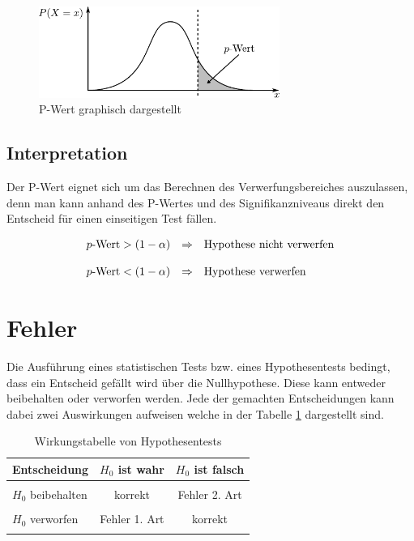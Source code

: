 \begin{figure}[h!]
	\centering
	\includegraphics[width=0.7\textwidth]{p-value.pdf}
	\caption{P-Wert graphisch dargestellt}
	\label{fig:p-wert}
\end{figure}

\subsection{Interpretation}
Der P-Wert eignet sich um das Berechnen des Verwerfungsbereiches auszulassen,
denn man kann anhand des P-Wertes und des Signifikanzniveaus direkt den 
Entscheid für einen einseitigen Test fällen.

\[ 
	\begin{array}{c c l}
		p\text{-Wert} > (1-\alpha)
			& \Rightarrow
			& \text{Hypothese nicht verwerfen} \\
		& & \\
		p\text{-Wert} < (1-\alpha)
			& \Rightarrow
			& \text{Hypothese verwerfen}
	\end{array} 
\]

\section{Fehler}
Die Ausführung eines statistischen Tests bzw. eines Hypothesentests bedingt,
dass ein Entscheid gefällt wird über die Nullhypothese. Diese kann entweder
beibehalten oder verworfen werden. Jede der gemachten Entscheidungen kann dabei
zwei Auswirkungen aufweisen welche in der Tabelle \ref{tab:wirkungstabelle} 
dargestellt sind.

\begin{table}[h!]
	\centering
	\begin{tabular}{l c c}
		Entscheidung
			& $H_0$ ist wahr 
			& $H_0$ ist falsch \\
		\hline
		&& \\
		$H_0$ beibehalten 
			& korrekt 
			& Fehler 2. Art \\
		&& \\
		$H_0$ verworfen 
			& Fehler 1. Art 
			& korrekt \\
		&& \\
	\end{tabular}
	\caption{Wirkungstabelle von Hypothesentests}
	\label{tab:wirkungstabelle}
\end{table}

